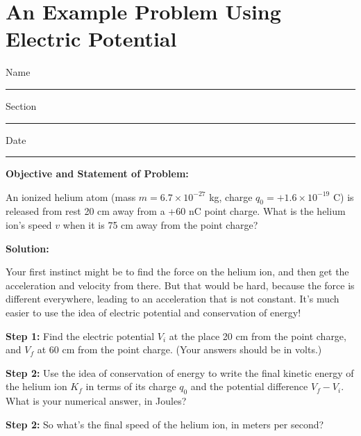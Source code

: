 \section{An Example Problem Using Electric Potential}

\begin{comment}
This lab is really just a worksheet I've used in my 132 class. --Matt Trawick, 6/2015
\end{comment}

Name \rule{2.0in}{0.1pt}\hfill{}Section \rule{1.0in}{0.1pt}\hfill{}Date
\rule{1.0in}{0.1pt}

\vspace{0.1in}
\textbf{Objective and Statement of Problem:}
 
An ionized helium atom (mass $m=6.7\times 10^{-27}$ kg, charge $q_0=+1.6\times 10^{-19}$ C) is released from rest 20 cm away from a +60 nC point charge.  What is the helium ion's speed $v$ when it is 75 cm away from the point charge?

\textbf{Solution:}

Your first instinct might be to find the force on the helium ion, and then get the acceleration and velocity from there.  But that would be hard, because the force is different everywhere, leading to an acceleration that is not constant.  It's much easier to use the idea of electric potential and conservation of energy!

\vspace{0.1in}

\textbf{Step 1:} \newline
Find the electric potential $V_i$ at the place 20 cm from the point charge, and $V_f$ at 60 cm from the point charge.  (Your answers should be in volts.)
\vspace{1.9in}


\textbf{Step 2:} \newline
Use the idea of conservation of energy to write the final kinetic energy of the helium ion $K_f$ in terms of its charge $q_0$ and the potential difference $V_f-V_i$.  What is your numerical answer, in Joules?
\vspace{1.6in}


\textbf{Step 2:} \newline
So what's the final speed of the helium ion, in meters per second?
\vspace{1.6in}
